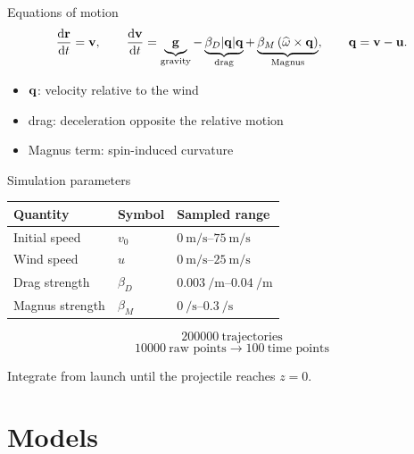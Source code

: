 \documentclass[10pt]{beamer}
\begin{document}
\begin{frame}{Equations of motion}
  \vspace{0.25cm}
  \[
    \dv{\vb{r}}{t}=\vb{v},
    \qquad
    \dv{\vb{v}}{t}
    =
    \underbrace{\vb{g}}_{\text{gravity}}
    -
    \underbrace{\beta_D\abs{\vb{q}}\vb{q}}_{\text{drag}}
    +
    \underbrace{\beta_M
      \left(\widehat{\vb{\omega}}\times\vb{q}\right)}_{\text{Magnus}},
    \qquad
    \vb{q}=\vb{v}-\vb{u}.
  \]

  \vspace{0.65cm}
  \begin{itemize}
    \setlength{\itemsep}{0.6em}
    \item $\vb{q}$: velocity relative to the wind
    \item drag: deceleration opposite the relative motion
    \item Magnus term: spin-induced curvature
  \end{itemize}
\end{frame}

\begin{frame}{Simulation parameters}
  \begin{table}
    \centering
    \begin{tabular}{@{}lll@{}}
      \toprule
      Quantity & Symbol & Sampled range \\
      \midrule
      Initial speed & $v_0$ & $\qtyrange{0}{75}{\meter\per\second}$ \\
      Wind speed & $u$ & $\qtyrange{0}{25}{\meter\per\second}$ \\
      Drag strength & $\beta_D$ & $\qtyrange{0.003}{0.04}{\per\meter}$ \\
      Magnus strength & $\beta_M$ & $\qtyrange{0}{0.3}{\per\second}$ \\
      \bottomrule
    \end{tabular}
  \end{table}

  \vspace{0.55cm}
  \[
    \num{200000}\ \text{trajectories}
  \]
  \[
    \num{10000}\ \text{raw points}
    \longrightarrow
    \num{100}\ \text{time points}
  \]

  \begin{center}
    Integrate from launch until the projectile reaches $z=0$.
  \end{center}
\end{frame}

\section{Models}
\end{document}
